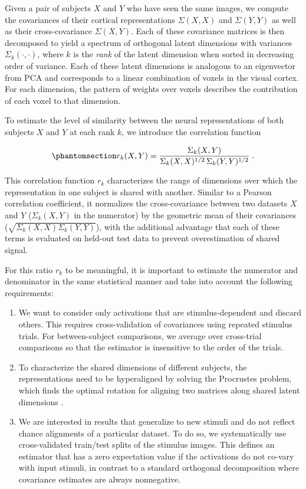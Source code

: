 \documentclass[10pt]{article}
\providecommand{\tightlist}{\setlength{\itemsep}{0pt}\setlength{\parskip}{0pt}}
\begin{document}
Given a pair of subjects \(X\) and \(Y\) who have seen the same images, we compute the covariances of their cortical representations \(\Sigma(X, X)\) and \(\Sigma(Y, Y)\) as well as their cross-covariance \(\Sigma(X, Y)\). Each of these covariance matrices is then decomposed to yield a spectrum of orthogonal latent dimensions with variances \(\Sigma_k(\cdot, \cdot)\), where \(k\) is the \emph{rank} of the latent dimension when sorted in decreasing order of variance. Each of these latent dimensions is analogous to an eigenvector from PCA and corresponds to a linear combination of voxels in the visual cortex. For each dimension, the pattern of weights over voxels describes the contribution of each voxel to that dimension.

To estimate the level of similarity between the neural representations of both subjects \(X\) and \(Y\) at each rank \(k\), we introduce the correlation function

\begin{equation}\phantomsection\label{eq:correlation-coefficient}{
r_k(X, Y) = \frac{\Sigma_k(X, Y)}{\Sigma_k(X, X)^{1/2}\, \Sigma_k(Y, Y)^{1/2}}\;.
}\end{equation}

This correlation function \(r_k\) characterizes the range of dimensions over which the representation in one subject is shared with another. Similar to a Pearson correlation coefficient, it normalizes the cross-covariance between two datasets \(X\) and \(Y\) (\(\Sigma_k(X, Y)\) in the numerator) by the geometric mean of their covariances (\(\sqrt{\Sigma_k(X, X) \Sigma_k(Y, Y)}\)), with the additional advantage that each of these terms is evaluated on held-out test data to prevent overestimation of shared signal.

For this ratio \(r_k\) to be meaningful, it is important to estimate the numerator and denominator in the same statistical manner and take into account the following requirements:

\begin{enumerate}
\def\labelenumi{\arabic{enumi}.}
\tightlist
\item
  We want to consider only activations that are stimulus-dependent and discard others. This requires cross-validation of covariances using repeated stimulus trials. For between-subject comparisons, we average over cross-trial comparisons so that the estimator is insensitive to the order of the trials.
\item
  To characterize the shared dimensions of different subjects, the representations need to be hyperaligned by solving the Procrustes problem, which finds the optimal rotation for aligning two matrices along shared latent dimensions \autocite{Haxby2011}.
\item
  We are interested in results that generalize to new stimuli and do not reflect chance alignments of a particular dataset. To do so, we systematically use cross-validated train/test splits of the stimulus images. This defines an estimator that has a zero expectation value if the activations do not co-vary with input stimuli, in contrast to a standard orthogonal decomposition where covariance estimates are always nonnegative.
\end{enumerate}
\end{document}
